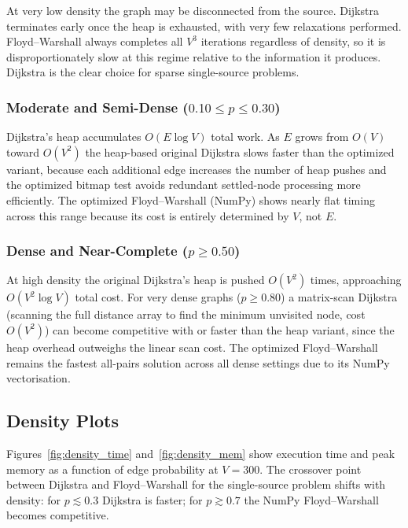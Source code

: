 \documentclass[12pt,a4paper]{article}
\begin{document}
	At very low density the graph may be disconnected from the source. Dijkstra
	terminates early once the heap is exhausted, with very few relaxations performed.
	Floyd--Warshall always completes all $V^3$ iterations regardless of density, so
	it is disproportionately slow at this regime relative to the information it
	produces. Dijkstra is the clear choice for sparse single-source problems.
	
	\subsubsection{Moderate and Semi-Dense ($0.10 \leq p \leq 0.30$)}
	
	Dijkstra's heap accumulates $O(E\log V)$ total work. As $E$ grows from
	$O(V)$ toward $O(V^2)$ the heap-based original Dijkstra slows faster than
	the optimized variant, because each additional edge increases the number of
	heap pushes and the optimized bitmap test avoids redundant settled-node
	processing more efficiently. The optimized Floyd--Warshall (NumPy) shows
	nearly flat timing across this range because its cost is entirely determined
	by $V$, not $E$.
	
	\subsubsection{Dense and Near-Complete ($p \geq 0.50$)}
	
	At high density the original Dijkstra's heap is pushed $O(V^2)$ times,
	approaching $O(V^2\log V)$ total cost. For very dense graphs ($p \geq 0.80$)
	a matrix-scan Dijkstra (scanning the full distance array to find the minimum
	unvisited node, cost $O(V^2)$) can become competitive with or faster than the
	heap variant, since the heap overhead outweighs the linear scan cost. The
	optimized Floyd--Warshall remains the fastest all-pairs solution across all
	dense settings due to its NumPy vectorisation.
	
	\subsection{Density Plots}
	
	Figures~\ref{fig:density_time} and~\ref{fig:density_mem} show execution time
	and peak memory as a function of edge probability at $V = 300$. The crossover
	point between Dijkstra and Floyd--Warshall for the single-source problem shifts
	with density: for $p \lesssim 0.3$ Dijkstra is faster; for $p \gtrsim 0.7$
	the NumPy Floyd--Warshall becomes competitive.
	
\end{document}
